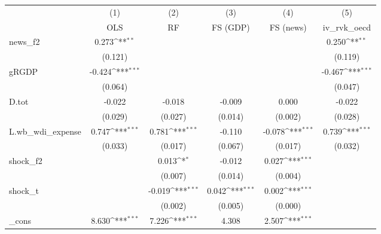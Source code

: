 {
\def\sym#1{\ifmmode^{#1}\else\(^{#1}\)\fi}
\begin{tabular}{l*{5}{c}}
\toprule
            &\multicolumn{1}{c}{(1)}&\multicolumn{1}{c}{(2)}&\multicolumn{1}{c}{(3)}&\multicolumn{1}{c}{(4)}&\multicolumn{1}{c}{(5)}\\
            &\multicolumn{1}{c}{OLS}&\multicolumn{1}{c}{RF}&\multicolumn{1}{c}{FS (GDP)}&\multicolumn{1}{c}{FS (news)}&\multicolumn{1}{c}{iv\_rvk\_oecd}\\
\midrule
news\_f2     &       0.273\sym{**} &                     &                     &                     &       0.250\sym{**} \\
            &     (0.121)         &                     &                     &                     &     (0.119)         \\
\addlinespace
gRGDP       &      -0.424\sym{***}&                     &                     &                     &      -0.467\sym{***}\\
            &     (0.064)         &                     &                     &                     &     (0.047)         \\
\addlinespace
D.tot       &      -0.022         &      -0.018         &      -0.009         &       0.000         &      -0.022         \\
            &     (0.029)         &     (0.027)         &     (0.014)         &     (0.002)         &     (0.028)         \\
\addlinespace
L.wb\_wdi\_expense&       0.747\sym{***}&       0.781\sym{***}&      -0.110         &      -0.078\sym{***}&       0.739\sym{***}\\
            &     (0.033)         &     (0.017)         &     (0.067)         &     (0.017)         &     (0.032)         \\
\addlinespace
shock\_f2    &                     &       0.013\sym{*}  &      -0.012         &       0.027\sym{***}&                     \\
            &                     &     (0.007)         &     (0.014)         &     (0.004)         &                     \\
\addlinespace
shock\_t     &                     &      -0.019\sym{***}&       0.042\sym{***}&       0.002\sym{***}&                     \\
            &                     &     (0.002)         &     (0.005)         &     (0.000)         &                     \\
\addlinespace
\_cons      &       8.630\sym{***}&       7.226\sym{***}&       4.308         &       2.507\sym{***}&                     \\

\end{tabular}}
